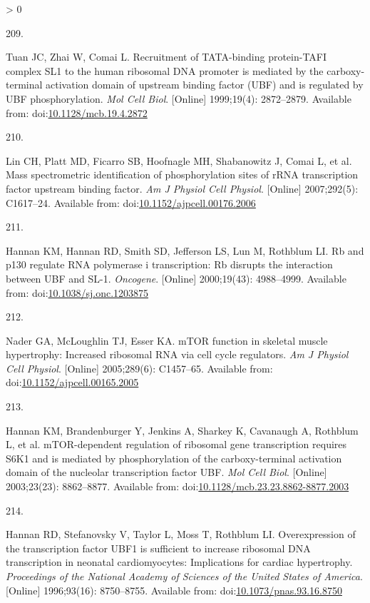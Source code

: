 \documentclass[twoside,10pt]{gihclass} %
\newlength{\cslhangindent}
\newlength{\csllabelwidth}
\newenvironment{CSLReferences}[3] %
 {%
  \setlength{\parindent}{0pt}
  \ifodd #1 \everypar{\setlength{\hangindent}{\cslhangindent}}\ignorespaces\fi
  \ifnum #2 > 0
  \setlength{\parskip}{#2\baselineskip}
  \fi
 }%
 {}
\newcommand{\CSLLeftMargin}[1]{\parbox[t]{\maxof{\widthof{#1}}{\csllabelwidth}}{#1}}
\newcommand{\CSLRightInline}[1]{\parbox[t]{\linewidth}{#1}}
\begin{document}
\begin{CSLReferences}{0}{0}
\leavevmode\hypertarget{ref-RN2582}{}%
\CSLLeftMargin{209. }
\CSLRightInline{Tuan JC, Zhai W, Comai L. Recruitment of TATA-binding protein-TAFI complex SL1 to the human ribosomal DNA promoter is mediated by the carboxy-terminal activation domain of upstream binding factor (UBF) and is regulated by UBF phosphorylation. \emph{Mol Cell Biol}. {[}Online{]} 1999;19(4): 2872--2879. Available from: doi:\href{https://doi.org/10.1128/mcb.19.4.2872}{10.1128/mcb.19.4.2872}}

\leavevmode\hypertarget{ref-RN2563}{}%
\CSLLeftMargin{210. }
\CSLRightInline{Lin CH, Platt MD, Ficarro SB, Hoofnagle MH, Shabanowitz J, Comai L, et al. Mass spectrometric identification of phosphorylation sites of rRNA transcription factor upstream binding factor. \emph{Am J Physiol Cell Physiol}. {[}Online{]} 2007;292(5): C1617--24. Available from: doi:\href{https://doi.org/10.1152/ajpcell.00176.2006}{10.1152/ajpcell.00176.2006}}

\leavevmode\hypertarget{ref-RN2213}{}%
\CSLLeftMargin{211. }
\CSLRightInline{Hannan KM, Hannan RD, Smith SD, Jefferson LS, Lun M, Rothblum LI. Rb and p130 regulate RNA polymerase i transcription: Rb disrupts the interaction between UBF and SL-1. \emph{Oncogene}. {[}Online{]} 2000;19(43): 4988--4999. Available from: doi:\href{https://doi.org/10.1038/sj.onc.1203875}{10.1038/sj.onc.1203875}}

\leavevmode\hypertarget{ref-RN1632}{}%
\CSLLeftMargin{212. }
\CSLRightInline{Nader GA, McLoughlin TJ, Esser KA. mTOR function in skeletal muscle hypertrophy: Increased ribosomal RNA via cell cycle regulators. \emph{Am J Physiol Cell Physiol}. {[}Online{]} 2005;289(6): C1457--65. Available from: doi:\href{https://doi.org/10.1152/ajpcell.00165.2005}{10.1152/ajpcell.00165.2005}}

\leavevmode\hypertarget{ref-RN2564}{}%
\CSLLeftMargin{213. }
\CSLRightInline{Hannan KM, Brandenburger Y, Jenkins A, Sharkey K, Cavanaugh A, Rothblum L, et al. mTOR-dependent regulation of ribosomal gene transcription requires S6K1 and is mediated by phosphorylation of the carboxy-terminal activation domain of the nucleolar transcription factor UBF. \emph{Mol Cell Biol}. {[}Online{]} 2003;23(23): 8862--8877. Available from: doi:\href{https://doi.org/10.1128/mcb.23.23.8862-8877.2003}{10.1128/mcb.23.23.8862-8877.2003}}

\leavevmode\hypertarget{ref-RN2566}{}%
\CSLLeftMargin{214. }
\CSLRightInline{Hannan RD, Stefanovsky V, Taylor L, Moss T, Rothblum LI. Overexpression of the transcription factor UBF1 is sufficient to increase ribosomal DNA transcription in neonatal cardiomyocytes: Implications for cardiac hypertrophy. \emph{Proceedings of the National Academy of Sciences of the United States of America}. {[}Online{]} 1996;93(16): 8750--8755. Available from: doi:\href{https://doi.org/10.1073/pnas.93.16.8750}{10.1073/pnas.93.16.8750}}


\end{CSLReferences}
\end{document}

